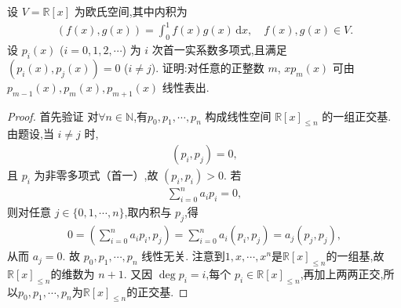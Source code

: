 \documentclass[../../main.tex]{subfiles}%
\begin{document}
\begin{example}
设 \( V = \mathbb{R}[x] \) 为欧氏空间,其中内积为
\begin{align*}
(f(x), g(x)) = \int_0^1 f(x)g(x) \, \mathrm{d}x, \quad f(x), g(x) \in V.
\end{align*}
设 \( p_i(x) \) (\( i = 0, 1, 2, \cdots \)) 为 \( i \) 次首一实系数多项式,且满足 \((p_i(x), p_j(x)) = 0\) (\( i \neq j \)). 证明:对任意的正整数 \( m \), \( x p_m(x) \) 可由 \( p_{m-1}(x), p_m(x), p_{m+1}(x) \) 线性表出.
\end{example}
\begin{proof}

首先验证 对$\forall n\in \mathbb{N}$,有\( p_0, p_1, \cdots, p_n \) 构成线性空间 \( \mathbb{R}[x]_{\leqslant n} \) 的一组正交基. 由题设,当 \( i \neq j \) 时,
\begin{align*}
(p_i, p_j) = 0,
\end{align*}
且 \( p_i \) 为非零多项式（首一）,故 \((p_i, p_i) > 0\). 若
\begin{align*}
\sum_{i=0}^n a_i p_i = 0,
\end{align*}
则对任意 \( j \in \{0,1,\cdots,n\} \),取内积与 \( p_j \),得
\begin{align*}
0 = \left( \sum_{i=0}^n a_i p_i, p_j \right) = \sum_{i=0}^n a_i (p_i, p_j) = a_j (p_j, p_j),
\end{align*}
从而 \( a_j = 0 \). 故 \( p_0, p_1, \cdots, p_n \) 线性无关.
注意到$1,x,\cdots,x^n$是$\mathbb{R}[x]_{\leqslant n}$的一组基,故$\mathbb{R}[x]_{\leqslant n}$的维数为 \( n+1 \).
又因 \( \deg p_i = i \),每个 \( p_i \in \mathbb{R}[x]_{\leqslant n} \),再加上两两正交,所以\( p_0, p_1, \cdots, p_n \)为$\mathbb{R}[x]_{\leqslant n}$的正交基.


\end{proof}
\end{document}
